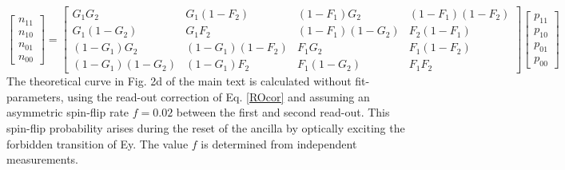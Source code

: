 \documentclass[12pt]{article}
\begin{document}
\begin{equation}
\left[
\begin{array}{c}
n_{11}\\
n_{10}\\
n_{01}\\
n_{00}
 \end{array}
 \right]=
 \left[
\begin{array}{cccc}
G_1 G_2 & G_1(1-F_2) & (1-F_1)G_2 & (1-F_1)(1-F_2)\\
G_1(1-G_2) & G_1 F_2 & (1-F_1)(1-G_2) & F_2(1-F_1)\\
(1-G_1)G_2 & (1-G_1)(1-F_2) & F_1 G_2 & F_1(1-F_2)\\
(1-G_1)(1-G_2) & (1-G_1)F_2 & F_1 (1-G_2) & F_1 F_2
 \end{array}
 \right]
\left[
\begin{array}{c}
p_{11}\\
p_{10}\\
p_{01}\\
p_{00}
 \end{array}
 \right] 
\label{ROcor}
\end{equation}
The theoretical curve in Fig. 2d of the main text is calculated without fit-parameters, using the read-out correction of Eq. \ref{ROcor} and assuming an asymmetric spin-flip rate $f= 0.02$ between the first and second read-out. This spin-flip probability arises during the reset of the ancilla by optically exciting the forbidden transition of Ey. The value $f$ is determined from independent measurements. \\
\end{document}

